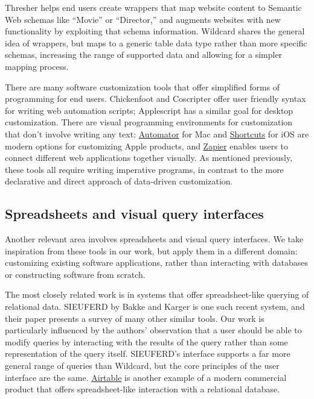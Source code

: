 \documentclass[sigplan,screen,10pt,anonymous,review]{acmart}
\begin{document}
Thresher \citep{hogue2005} helps end users create wrappers that map
website content to Semantic Web schemas like ``Movie'' or ``Director,''
and augments websites with new functionality by exploiting that schema
information. Wildcard shares the general idea of wrappers, but maps to a
generic table data type rather than more specific schemas, increasing
the range of supported data and allowing for a simpler mapping process.

There are many software customization tools that offer simplified forms
of programming for end users. Chickenfoot \citep{bolin2005} and
Coscripter \citep{leshed2008} offer user friendly syntax for writing web
automation scripts; Applescript \citep{cook2007} has a similar goal for
desktop customization. There are visual programming environments for
customization that don't involve writing any text:
\href{https://support.apple.com/guide/automator/welcome/mac}{Automator}
for Mac and
\href{https://apps.apple.com/us/app/shortcuts/id915249334}{Shortcuts}
for iOS are modern options for customizing Apple products, and
\href{https://zapier.com/}{Zapier} enables users to connect different
web applications together visually. As mentioned previously, these tools
all require writing imperative programs, in contrast to the more
declarative and direct approach of data-driven customization.

\hypertarget{spreadsheets-and-visual-query-interfaces}{%
\subsection{Spreadsheets and visual query
interfaces}\label{spreadsheets-and-visual-query-interfaces}}

Another relevant area involves spreadsheets and visual query interfaces.
We take inspiration from these tools in our work, but apply them in a
different domain: customizing existing software applications, rather
than interacting with databases or constructing software from scratch.

The most closely related work is in systems that offer spreadsheet-like
querying of relational data. SIEUFERD by Bakke and Karger
\citep{bakke2016} is one such recent system, and their paper presents a
survey of many other similar tools. Our work is particularly influenced
by the authors' observation that a user should be able to modify queries
by interacting with the results of the query rather than some
representation of the query itself. SIEUFERD's interface supports a far
more general range of queries than Wildcard, but the core principles of
the user interface are the same. \href{https://airtable.com/}{Airtable}
is another example of a modern commercial product that offers
spreadsheet-like interaction with a relational database.
\end{document}
